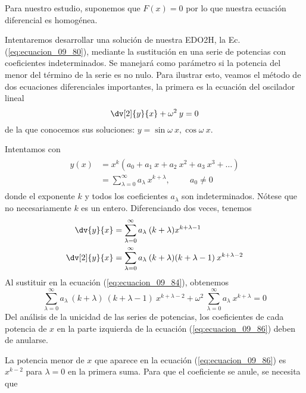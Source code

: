 \par
Para nuestro estudio, suponemos que $F(x) = 0$ por lo que nuestra ecuación diferencial es homogénea.
\par
Intentaremos desarrollar una solución de nuestra EDO2H, la Ec. (\ref{eq:ecuacion_09_80}), mediante la sustitución en una serie de potencias con coeficientes indeterminados. Se manejará como parámetro si la potencia del menor del término de la serie es no nulo. Para ilustrar esto, veamos el método de dos ecuaciones diferenciales importantes, la primera es la ecuación del oscilador lineal
\begin{equation}
\dv[2]{y}{x} + \omega^{2} \: y = 0
\label{eq:ecuacion_09_84}
\end{equation}
de la que conocemos sus soluciones: $y= \sin \omega \: x, \cos \omega \: x$.
\par
Intentamos con
\begin{align}
\begin{aligned}
y(x) &= x^{k} (a_{0} + a_{1} \: x + a_{2} \: x^{2} + a_{3} \: x^{3} + \ldots ) \\
&= \sum_{\lambda = 0}^{\infty} a_{\lambda} \: x^{k + \lambda}, \hspace{1cm} a_{0} \neq 0
\end{aligned}
\label{eq:ecuacion_09_85}
\end{align}
donde el exponente $k$ y todos los coeficientes $a_{\lambda}$ son indeterminados. Nótese que no necesariamente $k$ es un entero. Diferenciando dos veces, tenemos
\begin{align*}
\dv{y}{x} &= \sum_{\lambda=0}^{\infty} a_{\lambda} \: (k + \lambda) x^{k + \lambda - 1} \\
\dv[2]{y}{x} &= \sum_{\lambda=0}^{\infty} a_{\lambda} \: (k + \lambda) (k + \lambda - 1) \: x^{k + \lambda - 2} \nonumber
\end{align*}
Al sustituir en la ecuación (\ref{eq:ecuacion_09_84}), obtenemos
\begin{equation}
\sum_{\lambda=0}^{\infty} a_{\lambda} \: (k + \lambda) \: (k + \lambda - 1) \: x^{k + \lambda - 2} + \omega^{2} \: \sum_{\lambda = 0}^{\infty} a_{\lambda} \: x^{k + \lambda} = 0
\label{eq:ecuacion_09_86}
\end{equation}
Del análisis de la unicidad de las series de potencias, los coeficientes de cada potencia de $x$ en la parte izquierda de la ecuación (\ref{eq:ecuacion_09_86}) deben de anularse.
\par
La potencia menor de $x$ que aparece en la ecuación (\ref{eq:ecuacion_09_86}) es $x^{k - 2}$ para $\lambda = 0$ en la primera suma. Para que el coeficiente se anule, se necesita que
